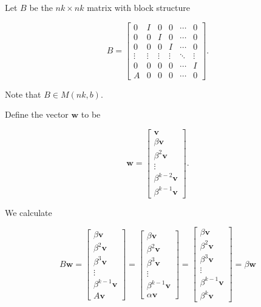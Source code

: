 \documentclass[11pt,letterpaper]{article}
\begin{document}
Let $B$ be the $n k \times n k$ matrix with block structure

\[
B=\left[\begin{array}{cccccc}
0 & I & 0 & 0 & \cdots & 0 \\
0 & 0 & I & 0 & \cdots & 0 \\
0 & 0 & 0 & I & \cdots & 0 \\
\vdots & \vdots & \vdots & \vdots & \ddots & \vdots \\
0 & 0 & 0 & 0 & \cdots & I \\
A & 0 & 0 & 0 & \cdots & 0
\end{array}\right] .
\]

Note that $B \in M(n k, b)$.

Define the vector $\mathbf{w}$ to be

\[
\mathbf{w}=\left[\begin{array}{c}
\mathbf{v} \\
\beta \mathbf{v} \\
\beta^{2} \mathbf{v} \\
\vdots \\
\beta^{k-2} \mathbf{v} \\
\beta^{k-1} \mathbf{v}
\end{array}\right] .
\]

We calculate

\[
B \mathbf{w}=\left[\begin{array}{c}
\beta \mathbf{v} \\
\beta^{2} \mathbf{v} \\
\beta^{3} \mathbf{v} \\
\vdots \\
\beta^{k-1} \mathbf{v} \\
A \mathbf{v}
\end{array}\right]=\left[\begin{array}{c}
\beta \mathbf{v} \\
\beta^{2} \mathbf{v} \\
\beta^{3} \mathbf{v} \\
\vdots \\
\beta^{k-1} \mathbf{v} \\
\alpha \mathbf{v}
\end{array}\right]=\left[\begin{array}{c}
\beta \mathbf{v} \\
\beta^{2} \mathbf{v} \\
\beta^{3} \mathbf{v} \\
\vdots \\
\beta^{k-1} \mathbf{v} \\
\beta^{k} \mathbf{v}
\end{array}\right]=\beta \mathbf{w}
\]
\end{document}
